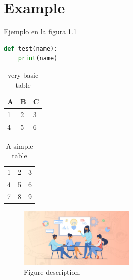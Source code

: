 \chapter{Example}
Ejemplo \cite{lehman2006biblatex} en la figura \ref{figura1}

\begin{lstlisting}[language=python,caption={Python example}]
def test(name):
	print(name)
\end{lstlisting}
\begin{table}[h]
	\centering
	\begin{tabular}{l | l | l}
		A & B & C \\
		\hline
		1 & 2 & 3 \\
		4 & 5 & 6
	\end{tabular}
	\caption{very basic table}
	\label{tab:abc}
\end{table}

\begin{table}[h]
	\centering
	\begin{tabular}{| l c r |}
		\hline
		1 & 2 & 3 \\
		4 & 5 & 6 \\
		7 & 8 & 9 \\
		\hline
	\end{tabular}
	\caption{A simple table}
\end{table}


\begin{figure}[h]
	
	\centering
	
	\includegraphics[width=0.5\textwidth]{image/cover.jpg}
	
	\caption{Figure description.}
	
	\label{figura1}
	
\end{figure}